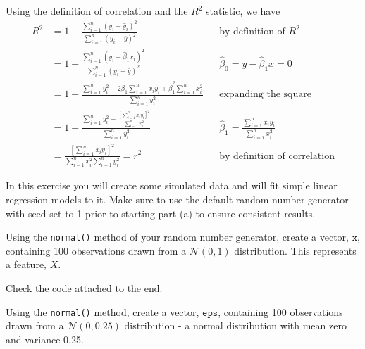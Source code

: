 \documentclass{article}
\newcommand{\N}{\mathcal{N}}
\begin{document}
\begin{probset}
\begin{prob}
    \begin{soln}
        Using the definition of correlation and the $R^2$ statistic, we have
        \begin{align*}
            R^2 &= 1 - \frac{\sum_{i=1}^n (y_i - \hat{y}_i)^2}{\sum_{i=1}^n (y_i - \bar{y})^2} && \text{by definition of $R^2$} \\
            &= 1 - \frac{\sum_{i=1}^n (y_i - \hat\beta_1 x_i)^2}{\sum_{i=1}^n (y_i - \bar{y})^2} && \hat\beta_0 = \bar{y} - \hat\beta_1 \bar{x} = 0 \\
            &= 1 - \frac{\sum_{i=1}^n y_i^2 - 2\hat\beta_1 \sum_{i=1}^n x_iy_i + \hat\beta_1^2 \sum_{i=1}^n x_i^2}{\sum_{i=1}^n y_i^2} && \text{expanding the square} \\
            &= 1 - \frac{\sum_{i=1}^n y_i^2 - \frac{\left[ \sum_{i=1}^n x_iy_i \right]^2}{\sum_{i=1}^n x_i^2}}{\sum_{i=1}^n y_i^2} && \hat\beta_1 = \frac{\sum_{i=1}^n x_iy_i}{\sum_{i=1}^n x_i^2} \\
            &= \frac{\left[ \sum_{i=1}^n x_iy_i \right]^2}{\sum_{i=1}^n x_i^2 \sum_{i=1}^n y_i^2} = r^2 && \text{by definition of correlation}
        \end{align*}
    \end{soln}
\end{prob}

\begin{prob}
    In this exercise you will create some simulated data and will fit simple linear regression models to it. Make sure to use the default random number generator with seed set to 1 prior to starting part (a) to ensure consistent results.

    \begin{subprobset}
        \begin{subprob}
            Using the \texttt{normal()} method of your random number generator, create a vector, $\texttt{x}$, containing 100 observations drawn from a $\N(0, 1)$ distribution. This represents a feature, $X$.

            \begin{soln}
                Check the code attached to the end.
            \end{soln}
        \end{subprob}

        \begin{subprob}
            Using the \texttt{normal()} method, create a vector, $\texttt{eps}$, containing 100 observations drawn from a $\N(0, 0.25)$ distribution - a normal distribution with mean zero and variance 0.25.


\end{subprob}
\end{subprobset}
\end{prob}
\end{probset}
\end{document}
